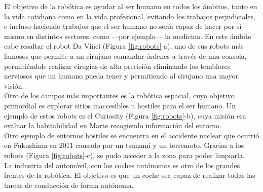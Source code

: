
El objetivo de la robótica es ayudar al ser humano en todos los ámbitos, tanto en la vida cotidiana como en la vida profesional, evitando los trabajos perjudiciales, e incluso haciendo trabajos que el ser humano no sería capaz de hacer por sí mismo en distintos sectores, como ---por ejemplo--- la medicina. En este ámbito cabe resaltar el robot Da Vinci (Figura \ref{fig:robots}-a), uno de sus robots más famosos que permite a un cirujano comandar órdenes a través de una consola, permitiéndole realizar cirugías de alta precisión eliminando los temblores nerviosos que un humano pueda tener y permitiendo al cirujano una mayor visión.\\
Otro de los campos más importantes es la robótica espacial, cuyo objetivo primordial es explorar sitios inaccesibles u hostiles para el ser humano. Un ejemplo de estos robots es el Curiosity (Figura \ref{fig:robots}-b), cuya misión era evaluar la habitabilidad en Marte recogiendo información del entorno.\\
Otro ejemplo de entornos hostiles se encuentra en el accidente nuclear que ocurrió en Fukushima en 2011 causado por un tsunami y un terremoto. Gracias a los robots (Figura \ref{fig:robots}-c), se pudo acceder a la zona para poder limpiarla.\\
La industria del automóvil, con los coches autónomos es otro de los grandes frentes de la robótica. El objetivo es que un coche sea capaz de realizar todas las tareas de conducción de forma autónoma.
